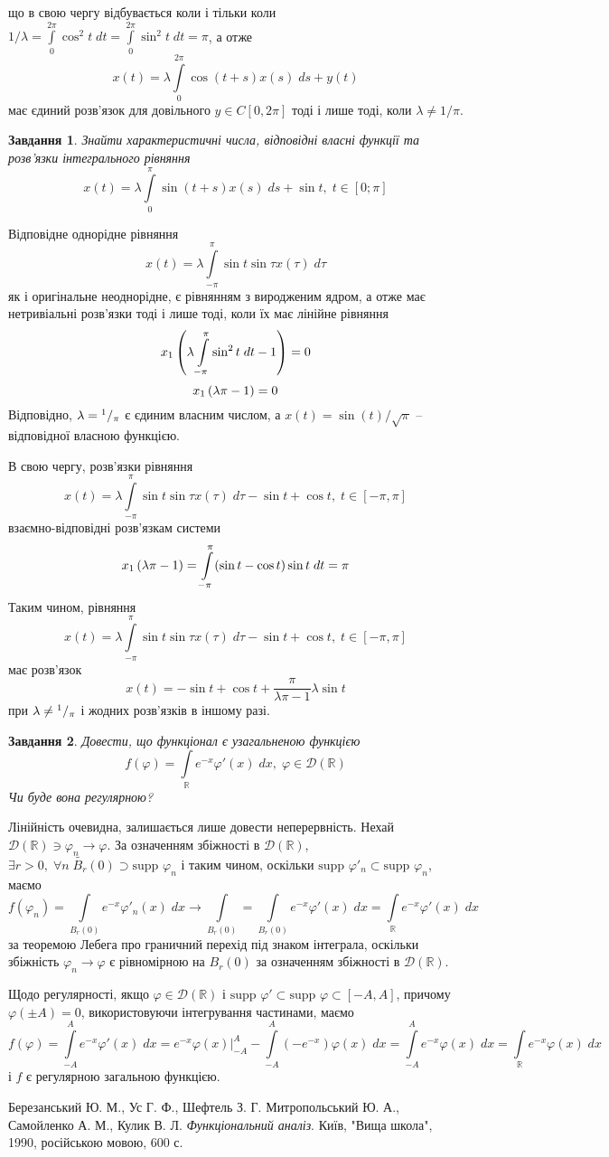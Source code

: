 \documentclass[10pt]{article}
\newtheorem{prob}{Завдання}
\newcommand{\ds}{\;ds}
\newcommand{\dt}{\;dt}
\newcommand{\dx}{\;dx}
\let\oldint\int
\renewcommand{\int}{\oldint\limits}
\let\phi\varphi
\begin{document}
		що в свою чергу відбувається коли і тільки коли $1/\lambda=\int_0^{2\pi}\cos^2t\dt=\int_0^{2\pi}\sin^2t\dt=\pi$, а отже
		\[x(t)=\lambda\int_0^{2\pi}\cos(t+s)x(s)\ds+y(t)\]
		має єдиний розв’язок для довільного $y\in C[0,2\pi]$ тоді і лише тоді, коли $\lambda\neq1/\pi$.
\begin{prob}
	Знайти характеристичні числа, відповідні власні функції та розв’язки інтегрального рівняння
	\[x(t)=\lambda\int_{0}^{\pi}\sin(t+s) x(s)\ds+\sin t,\;t\in[0;\pi]\]
\end{prob}
	Відповідне однорідне рівняння
	\[x(t)=\lambda\int_{-\pi}^{\pi}\sin t\sin\tau x(\tau)\;d\tau\]
	як і оригінальне неоднорідне, є рівнянням з виродженим ядром, а отже має нетривіальні розв’язки тоді і лише тоді, коли їх має лінійне
	рівняння
	\[x_1\mybra{\lambda\int_{-\pi}^\pi\sin^2 t\dt-1}=0\]
	\[x_1\left(\lambda\pi-1\right)=0\]
	Відповідно, $\lambda={^{1}/_{\pi}}$ є єдиним власним числом, а $x(t)=\sin(t)/\sqrt{\pi}$ -- відповідної власною функцією.

	В свою чергу, розв’язки рівняння
	\[x(t)=\lambda\int_{-\pi}^{\pi}\sin t\sin\tau x(\tau)\;d\tau-\sin t+\cos t,\;t\in[-\pi,\pi]\]
	взаємно-відповідні розв’язкам системи
	\[x_1\mybra{{\lambda}{\pi}-1}=\int_{-\pi}^\pi(\sin t-\cos t)\sin t\dt=\pi\]
	Таким чином, рівняння
	\[x(t)=\lambda\int_{-\pi}^{\pi}\sin t\sin\tau x(\tau)\;d\tau-\sin t+\cos t,\;t\in[-\pi,\pi]\]
	має розв’язок \[x(t)=-\sin t+\cos t+\frac{\pi}{\lambda\pi-1}\lambda\sin t\]
	при $\lambda\neq{^{1}/_{\pi}}$ і жодних розв’язків в іншому разі.
\begin{prob}
	Довести, що функціонал є узагальненою функцією	\[f(\phi)=\int_{\mathbb{R}}e^{-x}\phi'(x)\dx,\;\phi\in\mathcal{D}(\mathbb{R})\]
	Чи буде вона регулярною?
\end{prob}
\newcommand{\supp}{\mbox{supp }}
Лінійність очевидна, залишається лише довести неперервність. Нехай $\mathcal{D}(\mathbb{R})\ni\phi_n\to\phi$. За означенням
збіжності в $\mathcal{D}(\mathbb{R})$, $\exists r>0,\;
\forall n\;\widetilde{B_r}(0)\supset\supp\phi_n$ і таким чином, оскільки $\supp\phi'_n\subset\supp\phi_n$, маємо
\[f(\phi_n)=\int_{B_r(0)}e^{-x}\phi'_n(x)\dx\to\int_{B_r(0)}=\int_{B_r(0)}e^{-x}\phi'(x)\dx=\int_{\mathbb{R}}e^{-x}\phi'(x)\dx\]
за теоремою Лебега про граничний перехід під знаком інтеграла,
оскільки збіжність $\phi_n\to\phi$ є рівномірною на $B_r(0)$ за означенням збіжності в $\mathcal{D}(\mathbb{R})$.

Щодо регулярності, якщо $\phi\in\mathcal{D}(\mathbb{R})$ і $\supp\phi'\subset\supp\phi\subset[-A,A]$, причому $\phi(\pm A)=0$, використовуючи
інтегрування частинами, маємо
\[f(\phi)=\int_{-A}^Ae^{-x}\phi'(x)\dx=e^{-x}\phi(x)\bigg|_{-A}^A-\int_{-A}^A(-e^{-x})\phi(x)\dx=\int_{-A}^Ae^{-x}\phi(x)\dx=\int_\mathbb{R}
e^{-x}\phi(x)\dx\]
і $f$ є регулярною загальною функцією.
\begin{thebibliography}{9}
Березанський Ю. М., Ус Г. Ф., Шефтель З. Г.
Митропольський Ю. А., Самойленко А. М., Кулик В. Л.
\emph{Функціональний аналіз}.
Київ, "Вища школа"{}, 1990, російською мовою, 600 с.
\end{thebibliography}
\end{document}
